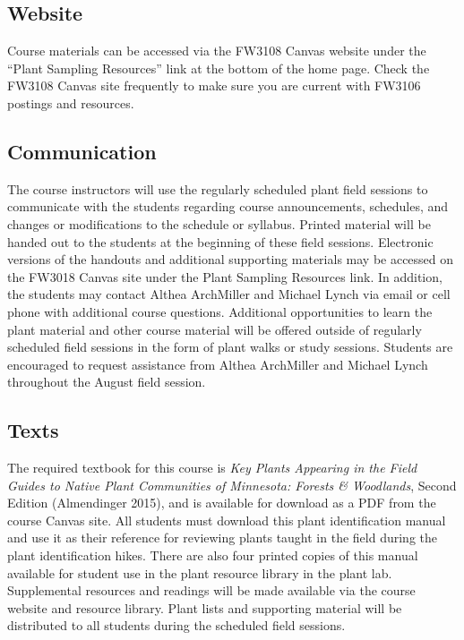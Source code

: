 \documentclass{tufte-handout}
\begin{document}
\begin{fullwidth}
\subsection{Website}

Course materials can be accessed via the FW3108 Canvas website under the ``Plant Sampling Resources'' link at the bottom of the home page. Check the FW3108 Canvas site frequently to make sure you are current with FW3106 postings and resources.

\subsection{Communication}

The course instructors will use the regularly scheduled plant field sessions to communicate with the students regarding course announcements, schedules, and changes or modifications to the schedule or syllabus. Printed material will be handed out to the students at the beginning of these field sessions. Electronic versions of the handouts and additional supporting materials may be accessed on the FW3018 Canvas site under the Plant Sampling Resources link. In addition, the students may contact Althea ArchMiller and Michael Lynch via email or cell phone with additional course questions. Additional opportunities to learn the plant material and other course material will be offered outside of regularly scheduled field sessions in the form of plant walks or study sessions. Students are encouraged to request assistance from Althea ArchMiller and Michael Lynch throughout the August field session.

\subsection{Texts} 

The required textbook for this course is \emph{Key Plants Appearing in the Field Guides to Native Plant Communities of Minnesota: Forests \& Woodlands}, Second Edition (Almendinger 2015), and is available for download as a PDF from the course Canvas site. All students must download this plant identification manual and use it as their reference for reviewing plants taught in the field during the plant identification hikes. There are also four printed copies of this manual available for student use in the plant resource library in the plant lab. Supplemental resources and readings will be made available via the course website and resource library. Plant lists and supporting material will be distributed to all students during the scheduled field sessions.


\end{fullwidth}
\end{document}
